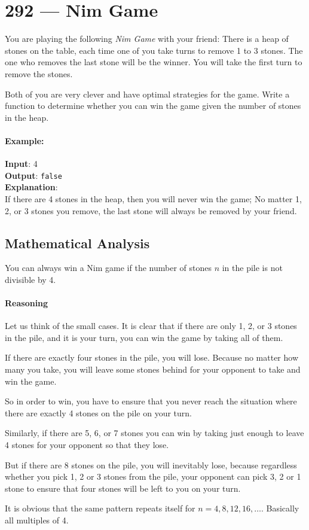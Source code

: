 \section{292 --- Nim Game}
You are playing the following \textit{Nim Game} with your friend: There is a heap of stones on the table, each time one of you take turns to remove 1 to 3 stones. The one who removes the last stone will be the winner. You will take the first turn to remove the stones.
\par
Both of you are very clever and have optimal strategies for the game. Write a function to determine whether you can win the game given the number of stones in the heap.

\paragraph{Example:}

\begin{flushleft}
\textbf{Input}: 4
\\
\textbf{Output}: \texttt{false} 
\\
\textbf{Explanation}: 
\\
If there are 4 stones in the heap, then you will never win the game; No matter 1, 2, or 3 stones you remove, the last stone will always be removed by your friend.
\end{flushleft}
\subsection{Mathematical Analysis}
You can always win a Nim game if the number of stones $n$ in the pile is not divisible by 4.

\paragraph{Reasoning}

Let us think of the small cases. It is clear that if there are only 1, 2, or 3 stones in the pile, and it is your turn, you can win the game by taking all of them. 
\par
If there are exactly four stones in the pile, you will lose. Because no matter how many you take, you will leave some stones behind for your opponent to take and win the game.
\par
So in order to win, you have to ensure that you never reach the situation where there are exactly 4 stones on the pile on your turn.
\par
Similarly, if there are 5, 6, or 7 stones you can win by taking just enough to leave 4 stones for your opponent so that they lose. 
\par
But if there are 8 stones on the pile, you will inevitably lose, because regardless whether you pick 1, 2 or 3 stones from the pile, your opponent can pick 3, 2 or 1 stone to ensure that four stones will be left to you on your turn.
\par
It is obvious that the same pattern repeats itself for $n=4,8,12,16,\dots$. Basically all multiples of 4.